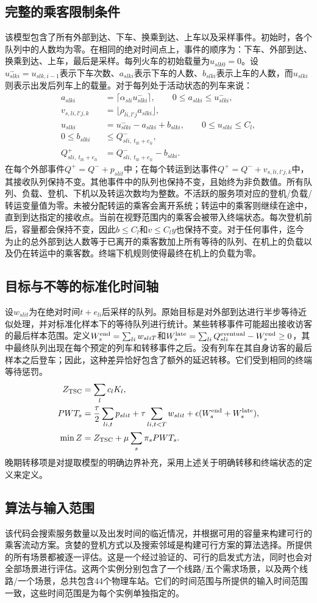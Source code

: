 \documentclass{article}
\begin{document}
\subsection*{完整的乘客限制条件}
该模型包含了所有外部到达、下车、换乘到达、上车以及采样事件。初始时，各个队列中的人数均为零。在相同的绝对时间点上，事件的顺序为：下车、外部到达、换乘到达、上车，最后是采样。每列火车的初始载量为$u_{slk0}=0$。设$u^-_{slki}=u_{slk,i-1}$表示下车次数、$a_{slki}$表示下车的人数、$b_{slki}$表示上车的人数，而$u_{slki}$则表示出发后列车上的载量。对于每列处于活动状态的列车来说：
\begin{align}
a_{slki}&=\lceil\alpha_{sli}u^-_{slki}\rceil,\qquad
0\le a_{slki}\le u^-_{slki},\\
v_{s,li,l'j,k}&=\lfloor\rho_{li,l'j}a_{slki}\rfloor,\\
u_{slki}&=u^-_{slki}-a_{slki}+b_{slki},\qquad0\le u_{slki}\le C_l,\\
0\le b_{slki}&\le Q^-_{sli,\ t_{lk}+e_{li}},\\
Q^+_{sli,\ t_{lk}+e_{li}}&=Q^-_{sli,\ t_{lk}+e_{li}}-b_{slki}.
\end{align}
在每个外部事件$Q^+=Q^-+p_{slit}$中；在每个转运到达事件$Q^+=Q^-+v_{s,li,l'j,k}$中，其接收队列保持不变。其他事件中的队列也保持不变，且始终为非负数值。所有队列、负载、登机、下机以及转运次数均为整数。不活跃的服务项对应的登机/负载/转运变量值为零。未被分配转运的乘客会离开系统；转运中的乘客则继续在途中，直到到达指定的接收点。当前在视野范围内的乘客会被带入终端状态。每次登机前后，容量都会保持不变，因此$b\le C_l$和$v\le C_l y$也保持不变。对于任何事件，迄今为止的总外部到达人数等于已离开的乘客数加上所有等待的队列、在机上的负载以及仍在转运中的乘客数。终端下机规则使得最终在机上的负载为零。

\subsection*{目标与不等的标准化时间轴}
设$w_{slit}$为在绝对时间$t+e_{li}$后采样的队列。原始目标是对外部到达进行半步等待近似处理，并对标准化样本下的等待队列进行统计。某些转移事件可能超出接收访客的最后样本范围。定义$W_s^{\rm end}=\sum_{li}w_{sliT}$和$W_s^{\rm late}=\sum_{li}Q_{sli}^{\rm eventual}-W_s^{\rm end}\ge0$，其中最终队列出现在每个预定的列车和转移事件之后。没有列车在其自身访客的最后样本之后登车；因此，这种差异恰好包含了额外的延迟转移。它们受到相同的终端等待惩罚。
\begin{align}
Z_{\rm TSC}&=\sum_l c_lK_l,\\
PWT_s&=\frac{\tau}{2}\sum_{li,t}p_{slit}
+\tau\sum_{li,t<T}w_{slit}
+\epsilon(W_s^{\rm end}+W_s^{\rm late}),\\
\min Z&=Z_{\rm TSC}+\mu\sum_s\pi_sPWT_s .
\end{align}
晚期转移项是对提取模型的明确边界补充，采用上述关于明确转移和终端状态的定义来定义。

\subsection*{算法与输入范围}
该代码会搜索服务数量以及出发时间的临近情况，并根据可用的容量来构建可行的乘客流动方案。贪婪的登机方式以及搜索邻域是构建可行方案的算法选择。所提供的所有场景都被逐一评估。这是一个经过验证的、可行的启发式方法，同时也会对全部场景进行评估。这两个实例分别包含了一个线路/五个需求场景，以及两个线路/一个场景，总共包含44个物理车站。它们的时间范围与所提供的输入时间范围一致，这些时间范围是为每个实例单独指定的。
\end{document}
